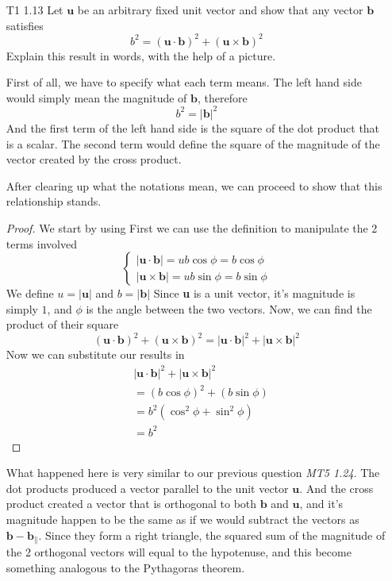 \documentclass[12pt]{article}
\newcommand{\paren}[1]{\left( #1 \right)}
\newcommand{\abso}[1]{\left|#1 \right|}
\begin{document}
\begin{enumerate}
    \item[T1 1.13]Let $\mathbf{u}$ be an arbitrary fixed unit vector and show that any vector $\mathbf{b}$ satisfies
        \[
        b^2 = (\mathbf{u} \cdot \mathbf{b})^2 + (\mathbf{u} \times \mathbf{b})^2
        \]
        Explain this result in words, with the help of a picture.

        First of all, we have to specify what each term means. The left hand side would simply mean the magnitude of $\mathbf{b}$, therefore
        \[
        b^2 = \abso{\mathbf{b}}^2
        \]
        And the first term of the left hand side is the square of the dot product that is a scalar. The second term would define the square of the magnitude of the vector created by the cross product. 

        After clearing up what the notations mean, we can proceed to show that this relationship stands.
        \begin{proof}
            We start by using 
            First we can use the definition to manipulate the 2 terms involved
            \[
            \begin{cases}
                \abso{\mathbf{u}\cdot\mathbf{b}} = ub\cos\phi = b\cos\phi\\
                \abso{\mathbf{u}\times\mathbf{b}} = ub\sin\phi =b\sin\phi
            \end{cases}
            \]
            We define $u = \abso{\mathbf{u}}$ and $b = \abso{\mathbf{b}}$ Since \textbf{u} is a unit vector, it's magnitude is simply $1$, and $\phi$ is the angle between the two vectors. Now, we can find the product of their square
            \[
            (\mathbf{u} \cdot \mathbf{b})^2 + (\mathbf{u} \times \mathbf{b})^2 = \abso{\mathbf{u}\cdot\mathbf{b}}^2 + \abso{\mathbf{u}\times\mathbf{b}}^2
            \]
            Now we can substitute our results in
            \begin{align*}
               &\abso{\mathbf{u}\cdot\mathbf{b}}^2 + \abso{\mathbf{u}\times\mathbf{b}}^2\\
               &= \paren{b\cos\phi}^2 + \paren{b\sin\phi}\\
               &= b^2 \paren{\cos^2\phi + \sin^2\phi}\\
               &=b^2
            \end{align*} 
        \end{proof}
        What happened here is very similar to our previous question \textit{MT5 1.24}. The dot products produced a vector parallel to the unit vector $\mathbf{u}$. And the cross product created a vector that is orthogonal to both $\mathbf{b}$ and $\mathbf{u}$, and it's magnitude happen to be the same as if we would subtract the vectors as $\mathbf{b} - \mathbf{b}_\parallel$. Since they form a right triangle, the squared sum of the magnitude of the 2 orthogonal vectors will equal to the hypotenuse, and this become something analogous to the Pythagoras theorem. 


\end{enumerate}
\end{document}
